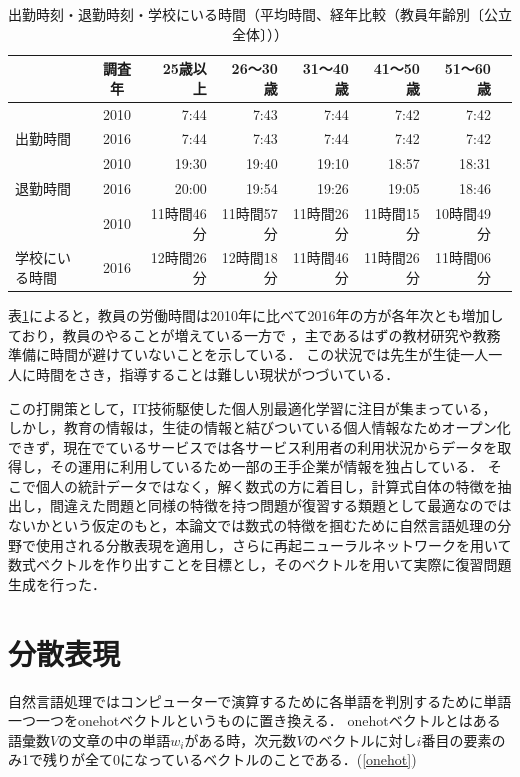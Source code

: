 \documentclass[a4j,11pt,report]{jsbook}
\begin{document}
\begin{center}
  \begin{table}[H]
    \begin{tabular}{|l|c|r|r|r|r|r|r|} \hline
      & 調査年 & 25歳以上 & 26〜30歳 & 31〜40歳 & 41〜50歳 & 51〜60歳  \\ \hline \hline
      & 2010 & 7:44 & 7:43 & 7:44 & 7:42 & 7:42 \\ \cline{2-7}
      出勤時間 & 2016 & 7:44 & 7:43 & 7:44 & 7:42 & 7:42 \\ \cline{2-7}\hline
      & 2010 & 19:30 & 19:40 & 19:10 & 18:57 & 18:31 \\ \cline{2-7}
      退勤時間 & 2016 & 20:00 & 19:54 & 19:26 & 19:05 & 18:46 \\ \cline{2-7}\hline
      & 2010 & 11時間46分 & 11時間57分 & 11時間26分 & 11時間15分 & 10時間49分  \\ \cline{2-7}
      学校にいる時間  & 2016 & 12時間26分 & 12時間18分 & 11時間46分 & 11時間26分 & 11時間06分 \\ \cline{2-7}\hline
    \end{tabular}

    \caption{出勤時刻・退勤時刻・学校にいる時間（平均時間、経年比較（教員年齢別〔公立全体〕））}
    \label{tb:teacher_time}
  \end{table}
\end{center}

表\ref{tb:teacher_time}によると，教員の労働時間は2010年に比べて2016年の方が各年次とも増加しており，教員のやることが増えている一方で
，主であるはずの教材研究や教務準備に時間が避けていないことを示している．
この状況では先生が生徒一人一人に時間をさき，指導することは難しい現状がつづいている．

この打開策として，IT技術駆使した個人別最適化学習に注目が集まっている，
しかし，教育の情報は，生徒の情報と結びついている個人情報なためオープン化できず，現在でているサービスでは各サービス利用者の利用状況からデータを取得し，その運用に利用しているため一部の王手企業が情報を独占している．
そこで個人の統計データではなく，解く数式の方に着目し，計算式自体の特徴を抽出し，間違えた問題と同様の特徴を持つ問題が復習する類題として最適なのではないかという仮定のもと，本論文では数式の特徴を掴むために自然言語処理の分野で使用される分散表現を適用し，さらに再起ニューラルネットワークを用いて数式ベクトルを作り出すことを目標とし，そのベクトルを用いて実際に復習問題生成を行った．

\chapter{分散表現\label{ch:Distributed representation}}
自然言語処理ではコンピューターで演算するために各単語を判別するために単語一つ一つをonehotベクトルというものに置き換える．
onehotベクトルとはある語彙数$V$の文章の中の単語$w_{i}$がある時，次元数$V$のベクトルに対し$i$番目の要素のみ1で残りが全て0になっているベクトルのことである．(\ref{onehot})
\end{document}
